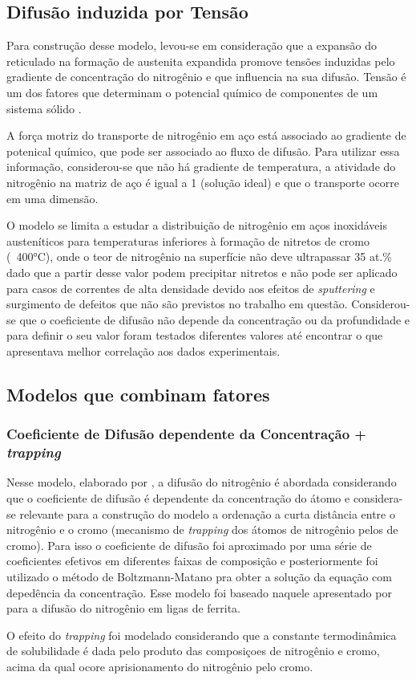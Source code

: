 \documentclass[]{politex}
\begin{document}
\subsection{Difusão induzida por Tensão}
\label{sec:tensao}
	Para construção desse modelo, levou-se em consideração que a expansão do reticulado na formação de austenita expandida promove tensões induzidas pelo gradiente de concentração do nitrogênio e que influencia na sua difusão. Tensão é um dos fatores que determinam o potencial químico de componentes de um sistema sólido \cite{galdikas2010stress}. \par
	 A força motriz do transporte de nitrogênio em aço está associado ao gradiente de potenical químico, que pode ser associado ao fluxo de difusão. Para utilizar essa informação, considerou-se que não há gradiente de temperatura, a atividade do nitrogênio na matriz de aço é igual a 1 (solução ideal) e que o transporte ocorre em uma dimensão. \par
	 O modelo se limita a estudar a distribuição de nitrogênio em aços inoxidáveis austeníticos para temperaturas inferiores à formação de nitretos de cromo (~400°C), onde o  teor de nitrogênio na superfície não deve ultrapassar 35 at.\% dado que a partir desse valor podem precipitar nitretos e não pode ser aplicado para casos de correntes de alta densidade devido aos efeitos de \textit{sputtering} e surgimento de defeitos que não são previstos no trabalho em questão.
	 Considerou-se que o coeficiente de difusão não depende da concentração ou da profundidade e para definir o seu valor foram testados diferentes valores até encontrar o que apresentava melhor correlação aos dados experimentais.
	 
\subsection{Modelos que combinam fatores}
\subsubsection{Coeficiente de Difusão dependente da Concentração + \textit{trapping}}
\label{sec:comb-depc-td}
	Nesse modelo, elaborado por \cite{christiansen2008nitrogen}, a difusão do nitrogênio é abordada considerando que o coeficiente de difusão é dependente da concentração do átomo  e considera-se relevante para a construção do modelo a ordenação a curta distância entre o nitrogênio e o cromo (mecanismo de \textit{trapping} dos átomos de nitrogênio pelos de cromo). Para isso o coeficiente de difusão foi aproximado por uma série de coeficientes efetivos em diferentes faixas de composição e posteriormente foi utilizado o método de Boltzmann-Matano pra obter a solução da equação com depedência da concentração. Esse modelo foi baseado naquele apresentado por \cite{sun1997numerical} para a difusão do nitrogênio em ligas de ferrita.\par
	O efeito do \textit{trapping} foi modelado considerando que a constante termodinâmica de solubilidade é dada pelo produto das composiçoes de nitrogênio e cromo, acima da qual ocore aprisionamento do nitrogênio pelo cromo.
	
\end{document}
